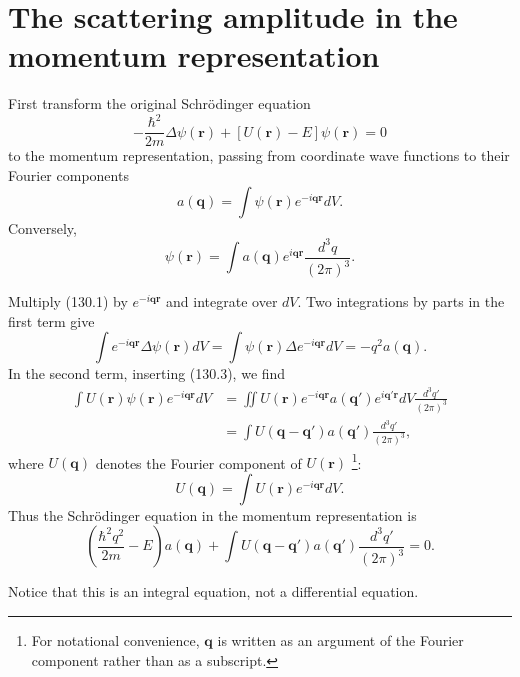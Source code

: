 \section{The scattering amplitude in the momentum representation}



First transform the original Schrödinger equation
\begin{equation}
 -\frac{\hbar^2}{2m}\Delta\psi(\mathbf r)+[U(\mathbf r)-E]\psi(\mathbf r)=0
 \tag{130.1}
\end{equation}
to the momentum representation, passing from coordinate wave functions to
their Fourier components
\begin{equation}
 a(\mathbf q)=\int\psi(\mathbf r)e^{-i\mathbf{qr}}dV.
 \tag{130.2}
\end{equation}
Conversely,
\begin{equation}
 \psi(\mathbf r)=\int a(\mathbf q)e^{i\mathbf{qr}}
 \frac{d^3q}{(2\pi)^3}.
 \tag{130.3}
\end{equation}

Multiply (130.1) by $e^{-i\mathbf{qr}}$ and integrate over $dV$. Two
integrations by parts in the first term give
\[
 \int e^{-i\mathbf{qr}}\Delta\psi(\mathbf r)dV
 =\int\psi(\mathbf r)\Delta e^{-i\mathbf{qr}}dV=-q^2a(\mathbf q).
\]
In the second term, inserting (130.3), we find
\[
 \begin{aligned}
 \int U(\mathbf r)\psi(\mathbf r)e^{-i\mathbf{qr}}dV
 &=\iint U(\mathbf r)e^{-i\mathbf{qr}}a(\mathbf q')
 e^{i\mathbf q'\mathbf r}dV\frac{d^3q'}{(2\pi)^3}\\
 &=\int U(\mathbf q-\mathbf q')a(\mathbf q')\frac{d^3q'}{(2\pi)^3},
 \end{aligned}
\]
where $U(\mathbf q)$ denotes the Fourier component of $U(\mathbf r)$
\footnote{For notational convenience, $\mathbf q$ is written as an argument
of the Fourier component rather than as a subscript.}:
\[
 U(\mathbf q)=\int U(\mathbf r)e^{-i\mathbf{qr}}dV.
\]
Thus the Schrödinger equation in the momentum representation is
\begin{equation}
 \left(\frac{\hbar^2q^2}{2m}-E\right)a(\mathbf q)
 +\int U(\mathbf q-\mathbf q')a(\mathbf q')\frac{d^3q'}{(2\pi)^3}=0.
 \tag{130.4}
\end{equation}

Notice that this is an integral equation, not a differential equation.

